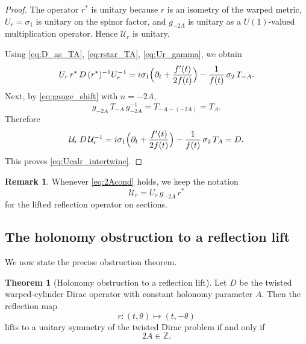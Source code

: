 \documentclass[11pt]{article}
\theoremstyle{definition}
\newtheorem{theorem}{Theorem}[section]
\newtheorem{remark}[remark]{Remark}
\numberwithin{equation}{section}
\begin{document}
\begin{proof}
The operator \(r^*\) is unitary because \(r\) is an isometry of the warped metric, \(U_r=\sigma_1\) is unitary on the spinor factor, and \(g_{-2A}\) is unitary as a \(U(1)\)-valued multiplication operator. Hence \(\mathcal U_r\) is unitary.

Using \eqref{eq:D_as_TA}, \eqref{eq:rstar_TA}, \eqref{eq:Ur_gamma}, we obtain
\begin{equation}\label{eq:Ur_rstar_conj_D}
U_r\,r^*\,D\,(r^*)^{-1}U_r^{-1}
=
i\sigma_1\Bigl(\partial_t+\frac{f'(t)}{2f(t)}\Bigr)
-
\frac{1}{f(t)}\,\sigma_2\,T_{-A}.
\end{equation}
Next, by \eqref{eq:gauge_shift} with \(n=-2A\),
\begin{equation}\label{eq:gauge_compensation}
g_{-2A}\,T_{-A}\,g_{-2A}^{-1}
=
T_{-A-(-2A)}
=
T_A.
\end{equation}
Therefore
\begin{equation}\label{eq:full_conj_D}
\mathcal U_r\,D\,\mathcal U_r^{-1}
=
i\sigma_1\Bigl(\partial_t+\frac{f'(t)}{2f(t)}\Bigr)
-
\frac{1}{f(t)}\,\sigma_2\,T_A
=
D.
\end{equation}
This proves \eqref{eq:Ucalr_intertwine}.
\end{proof}

\begin{remark}
\label{rem:lifted_reflection_notation}
Whenever \eqref{eq:2Acond} holds, we keep the notation
\begin{equation}\label{eq:Ucalr_repeat}
\mathcal U_r=U_r\,g_{-2A}\,r^*
\end{equation}
for the lifted reflection operator on sections.
\end{remark}

\subsection{The holonomy obstruction to a reflection lift}

We now state the precise obstruction theorem.

\begin{theorem}[Holonomy obstruction to a reflection lift]
\label{thm:O2lift}
Let \(D\) be the twisted warped-cylinder Dirac operator with constant holonomy parameter \(A\).
Then the reflection map
\begin{equation}\label{eq:reflection_map_repeat}
r:(t,\theta)\longmapsto(t,-\theta)
\end{equation}
lifts to a unitary symmetry of the twisted Dirac problem if and only if
\begin{equation}\label{eq:O2_if_and_only_if}
2A\in\mathbb Z.
\end{equation}
\end{theorem}
\end{document}
